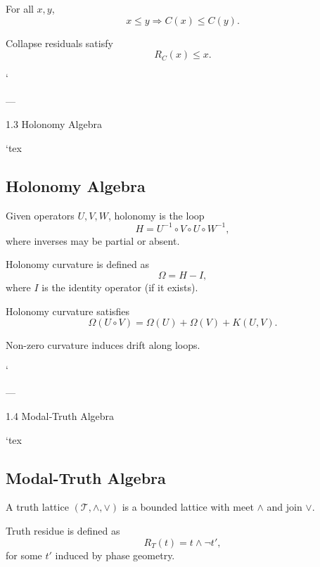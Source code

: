 \begin{axiom}
For all $x,y$,
\[
x \le y \Rightarrow C(x) \le C(y).
\]
\end{axiom}

\begin{axiom}
Collapse residuals satisfy
\[
R_C(x) \le x.
\]
\end{axiom}
`

---

1.3 Holonomy Algebra

`tex
\subsection{Holonomy Algebra}

\begin{definition}[Holonomy]
Given operators $U,V,W$, holonomy is the loop
\[
H = U^{-1} \circ V \circ U \circ W^{-1},
\]
where inverses may be partial or absent.
\end{definition}

\begin{definition}
Holonomy curvature is defined as
\[
\Omega = H - I,
\]
where $I$ is the identity operator (if it exists).
\end{definition}

\begin{axiom}
Holonomy curvature satisfies
\[
\Omega(U \circ V) = \Omega(U) + \Omega(V) + K(U,V).
\]
\end{axiom}

\begin{axiom}
Non-zero curvature induces drift along loops.
\end{axiom}
`

---

1.4 Modal‑Truth Algebra

`tex
\subsection{Modal-Truth Algebra}

\begin{definition}
A truth lattice $(\mathcal{T}, \wedge, \vee)$ is a bounded lattice with meet $\wedge$
and join $\vee$.
\end{definition}

\begin{definition}
Truth residue is defined as
\[
R_T(t) = t \wedge \neg t',
\]
for some $t'$ induced by phase geometry.
\end{definition}

